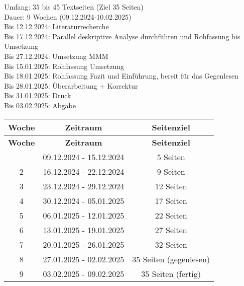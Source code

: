 
\newpage
Umfang: 35 bis 45 Textseiten (Ziel 35 Seiten)\\
Dauer: 9 Wochen (09.12.2024-10.02.2025)\\
Bis 12.12.2024: Literaturrecherche\\
Bis 17.12.2024: Parallel deskriptive Analyse durchführen und Rohfassung bis Umsetzung\\
Bis 27.12.2024: Umsetzung MMM\\
Bis 15.01.2025: Rohfassung Umsetzung\\
Bis 18.01.2025: Rohfassung Fazit und Einführung, bereit für das Gegenlesen \\
Bis 28.01.2025: Überarbeitung + Korrektur\\
Bis 31.01.2025: Druck\\
Bis 03.02.2025: Abgabe\\


\begin{longtable}{|c|c|c|}
\hline
\textbf{Woche} & \textbf{Zeitraum} & \textbf{Seitenziel} \\
\hline
\endfirsthead
\hline
\textbf{Woche} & \textbf{Zeitraum} & \textbf{Seitenziel} \\
\hline
\endhead
\hline
\endfoot
\hline
1 & 09.12.2024 - 15.12.2024 & 5 Seiten \\
2 & 16.12.2024 - 22.12.2024 & 9 Seiten \\
3 & 23.12.2024 - 29.12.2024 & 12 Seiten \\
4 & 30.12.2024 - 05.01.2025 & 17 Seiten \\
5 & 06.01.2025 - 12.01.2025 & 22 Seiten \\
6 & 13.01.2025 - 19.01.2025 & 27 Seiten \\
7 & 20.01.2025 - 26.01.2025 & 32 Seiten \\
8 & 27.01.2025 - 02.02.2025 & 35 Seiten (gegenlesen) \\
9 & 03.02.2025 - 09.02.2025 & 35 Seiten (fertig) \\
\hline
\end{longtable}